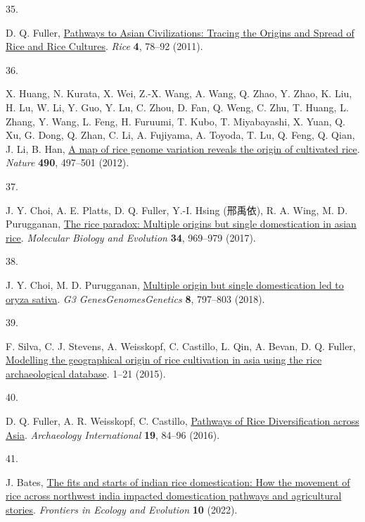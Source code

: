 \documentclass[
  letterpaper,
  DIV=11,
  numbers=noendperiod]{scrartcl}
\newlength{\cslhangindent}
\newlength{\csllabelwidth}
\newenvironment{CSLReferences}[2] %
 {\begin{list}{}{%
  \setlength{\itemindent}{0pt}
  \setlength{\leftmargin}{0pt}
  \setlength{\parsep}{0pt}
  \ifodd #1
   \setlength{\leftmargin}{\cslhangindent}
   \setlength{\itemindent}{-1\cslhangindent}
  \fi
  \setlength{\itemsep}{#2\baselineskip}}}
 {\end{list}}
\newcommand{\CSLLeftMargin}[1]{\parbox[t]{\csllabelwidth}{\strut#1\strut}}
\newcommand{\CSLRightInline}[1]{\parbox[t]{\linewidth - \csllabelwidth}{\strut#1\strut}}
\begin{document}
\begin{CSLReferences}{0}{1}
\CSLLeftMargin{35. }%
\CSLRightInline{D. Q. Fuller,
\href{https://doi.org/10.1007/s12284-011-9078-7}{Pathways to Asian
Civilizations: Tracing the Origins and Spread of Rice and Rice
Cultures}. \emph{Rice} \textbf{4}, 78--92 (2011).}

\CSLLeftMargin{36. }%
\CSLRightInline{X. Huang, N. Kurata, X. Wei, Z.-X. Wang, A. Wang, Q.
Zhao, Y. Zhao, K. Liu, H. Lu, W. Li, Y. Guo, Y. Lu, C. Zhou, D. Fan, Q.
Weng, C. Zhu, T. Huang, L. Zhang, Y. Wang, L. Feng, H. Furuumi, T. Kubo,
T. Miyabayashi, X. Yuan, Q. Xu, G. Dong, Q. Zhan, C. Li, A. Fujiyama, A.
Toyoda, T. Lu, Q. Feng, Q. Qian, J. Li, B. Han,
\href{https://doi.org/10.1038/nature11532}{A map of rice genome
variation reveals the origin of cultivated rice}. \emph{Nature}
\textbf{490}, 497--501 (2012).}

\CSLLeftMargin{37. }%
\CSLRightInline{J. Y. Choi, A. E. Platts, D. Q. Fuller, Y.-I. Hsing
(邢禹依), R. A. Wing, M. D. Purugganan,
\href{https://doi.org/10.1093/molbev/msx049}{The rice paradox: Multiple
origins but single domestication in asian rice}. \emph{Molecular Biology
and Evolution} \textbf{34}, 969--979 (2017).}

\CSLLeftMargin{38. }%
\CSLRightInline{J. Y. Choi, M. D. Purugganan,
\href{https://doi.org/10.1534/g3.117.300334}{Multiple origin but single
domestication led to oryza sativa}. \emph{G3
Genes\textbar Genomes\textbar Genetics} \textbf{8}, 797--803 (2018).}

\CSLLeftMargin{39. }%
\CSLRightInline{F. Silva, C. J. Stevens, A. Weisskopf, C. Castillo, L.
Qin, A. Bevan, D. Q. Fuller,
\href{https://doi.org/10.1371/journal.pone.0137024}{Modelling the
geographical origin of rice cultivation in asia using the rice
archaeological database}. 1--21 (2015).}

\CSLLeftMargin{40. }%
\CSLRightInline{D. Q. Fuller, A. R. Weisskopf, C. Castillo,
\href{http://doi.\%20org/10.5334/ai.1915}{Pathways of Rice
Diversification across Asia}. \emph{Archaeology International}
\textbf{19}, 84--96 (2016).}

\CSLLeftMargin{41. }%
\CSLRightInline{J. Bates,
\href{https://doi.org/10.3389/fevo.2022.924977}{The fits and starts of
indian rice domestication: How the movement of rice across northwest
india impacted domestication pathways and agricultural stories}.
\emph{Frontiers in Ecology and Evolution} \textbf{10} (2022).}


\end{CSLReferences}
\end{document}
